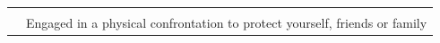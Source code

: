 \documentclass[utf8]{article}
\begin{document}
\begin{table}[]
{\begin{tabular}{ll}
                                                                                                                                                                                                                                                 &                                                                                                                                                                                                       \\
                                                                                                                                                                                                                                                 & Engaged in a physical confrontation to protect yourself, friends or family                                                                                                                           
\end{tabular}%
}
\end{table}
\clearpage



\end{document}
